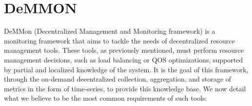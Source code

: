 

\chapter{DeMMON}
\label{cha:demmon} 

DeMMon (Decentralized Management and Monitoring framework) is a monitoring framework that aims to tackle the needs of decentralized resource management tools. These tools, as previously mentioned, must perform resource management decisions, such as load balancing or QOS optimizations, supported by partial and localized knowledge of the system. It is the goal of this framework, through the on-demand decentralized collection, aggregation, and storage of metrics in the form of time-series, to provide this knowledge base. We now detail what we believe to be the most common requirements of such tools:

